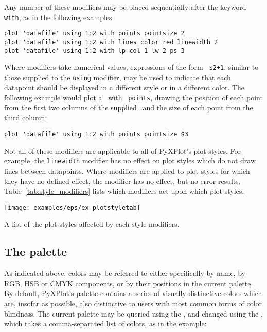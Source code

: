 Any number of these modifiers may be placed sequentially after the keyword {\tt
with}, as in the following examples:

\begin{verbatim}
plot 'datafile' using 1:2 with points pointsize 2
plot 'datafile' using 1:2 with lines color red linewidth 2
plot 'datafile' using 1:2 with lp col 1 lw 2 ps 3
\end{verbatim}

\noindent Where modifiers take numerical values, expressions of the form {\tt
\$2+1}, similar to those supplied to the {\tt using} modifier, may be used to
indicate that each datapoint should be displayed in a different style or in a
different color. The following example would plot a \datafile\ with {\tt
points}, drawing the position of each point from the first two columns of the
supplied \datafile\ and the size of each point from the third column:
\begin{verbatim}
plot 'datafile' using 1:2 with points pointsize $3
\end{verbatim}

Not all of these modifiers are applicable to all of PyXPlot's plot styles. For
example, the {\tt line\-width} modifier has no effect on plot styles which do
not draw lines between datapoints. Where modifiers are applied to plot styles
for which they have no defined effect, the modifier has no effect, but no error
results.  Table~\ref{tab:style_modifiers} lists which modifiers act upon which
plot styles.

\begin{table}
\centerline{\texttt{[image: examples/eps/ex\_plotstyletab]}}
\caption{A list of the plot styles affected by each style modifiers.}
\label{tab:style_modifiers}
\end{table}

\subsection{The palette}
\label{sec:palette}

 As indicated above, colors
may be referred to either specifically by name, by RGB, HSB or CMYK components,
or by their positions in the current palette. By default, PyXPlot's palette
contains a series of visually distinctive colors which are, insofar as
possible, also distinctive to users with most common forms of color blindness.
The current palette may be queried using the , and
changed using the , which takes a comma-separated list of
colors, as in the example:


